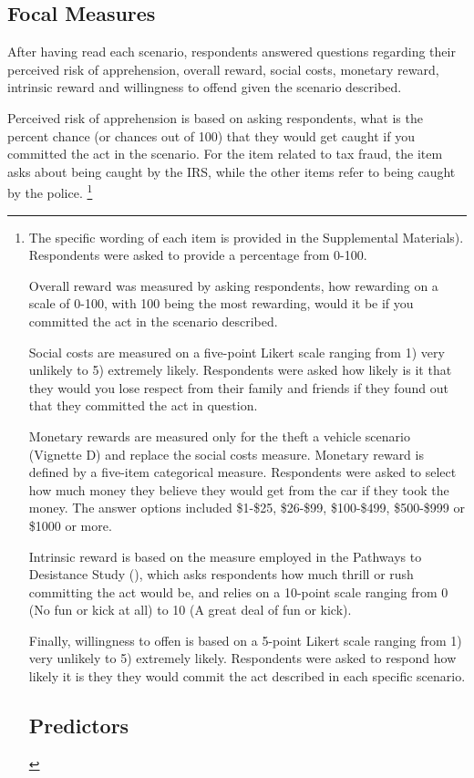 \documentclass{article} %
\begin{document}
\begin{enumerate}[A]
\subsection{Focal Measures}

After having read each scenario, respondents answered questions regarding their perceived risk of apprehension, overall reward, social costs, monetary reward, intrinsic reward and willingness to offend given the scenario described. 

Perceived risk of apprehension is based on asking respondents, what is the percent chance (or chances out of 100) that they would get caught if you committed the act in the scenario. For the item related to tax fraud, the item asks about being caught by the IRS, while the other items refer to being caught by the police. \footnote{The specific wording of each item is provided in the Supplemental Materials). Respondents were asked to provide a percentage from 0-100. 

Overall reward was measured by asking respondents, how rewarding on a scale of 0-100, with 100 being the most rewarding, would it be if you committed the act in the scenario described. 

Social costs are measured on a five-point Likert scale ranging from 1) very unlikely to 5) extremely likely. Respondents were asked how likely is it that they would you lose respect from their family and friends if they found out that they committed the act in question.

Monetary rewards are measured only for the theft a vehicle scenario (Vignette D) and replace the social costs measure. Monetary reward is defined by a five-item categorical measure. Respondents were asked to select how much money they believe they would get from the car if they took the money. The answer options included \$1-\$25, \$26-\$99, \$100-\$499, \$500-\$999 or \$1000 or more. 

Intrinsic reward is based on the measure employed in the Pathways to Desistance Study (), which asks respondents how much thrill or rush committing the act would be, and relies on a 10-point scale ranging from 0 (No fun or kick at all) to 10 (A great deal of fun or kick). 

Finally, willingness to offen is based on a 5-point Likert scale ranging from 1) very unlikely to 5) extremely likely. Respondents were asked to respond how likely it is they they would commit the act described in each specific scenario. 


\subsection{Predictors}

}
\end{enumerate}
\end{document}
